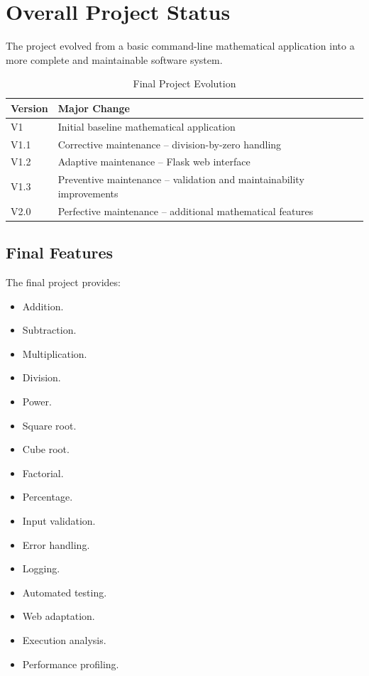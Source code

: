 \documentclass[12pt,a4paper]{report}
\begin{document}

\chapter{Overall Project Status}

The project evolved from a basic command-line mathematical
application into a more complete and maintainable software system.

\begin{table}[H]
\centering
\caption{Final Project Evolution}
\begin{tabular}{p{3cm}p{7cm}}
\toprule
\textbf{Version} & \textbf{Major Change} \\
\midrule
V1 & Initial baseline mathematical application \\
V1.1 & Corrective maintenance -- division-by-zero handling \\
V1.2 & Adaptive maintenance -- Flask web interface \\
V1.3 & Preventive maintenance -- validation and maintainability improvements \\
V2.0 & Perfective maintenance -- additional mathematical features \\
\bottomrule
\end{tabular}
\end{table}

\section{Final Features}

The final project provides:

\begin{itemize}
    \item Addition.
    \item Subtraction.
    \item Multiplication.
    \item Division.
    \item Power.
    \item Square root.
    \item Cube root.
    \item Factorial.
    \item Percentage.
    \item Input validation.
    \item Error handling.
    \item Logging.
    \item Automated testing.
    \item Web adaptation.
    \item Execution analysis.
    \item Performance profiling.
\end{itemize}
\end{document}
